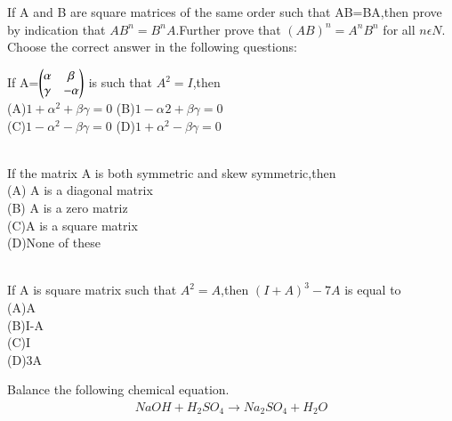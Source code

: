   \item If A and B are square matrices of the same order such that AB=BA,then prove by indication that $AB^{n}=B^{n}A$.Further prove that $(AB)^{n}=A^{n}B^{n}$ for all $n \epsilon N$.\\
  Choose the correct answer in the following questions:\\
  \item If A=$\begin{pmatrix}\alpha &\beta\\ \gamma &-\alpha\end{pmatrix}$ is such that $A^{2}=I$,then\\
  (A)$1+\alpha^{2}+\beta\gamma=0$ (B)$1-\alpha^{}2+\beta\gamma=0$\\
  (C)$1-\alpha^{2}-\beta\gamma=0$ (D)$1+\alpha^{2}-\beta\gamma=0$\\
\\
\solution

  \item If the matrix A is both symmetric and skew symmetric,then\\
  (A) A is a diagonal matrix \\
  (B) A is a zero matriz\\
  (C)A is a square matrix \\
  (D)None of these\\
  \\
\solution



  \item If A is square matrix such that $A^{2}=A$,then $(I+A)^{3}-7A$ is equal to\\
  (A)A \\(B)I-A\\ (C)I\\ (D)3A
\\
\solution

\item Balance the following chemical equation.
\begin{align}
  \label{matrix/50/eq1}
NaOH + H_2SO_4 \xrightarrow{} Na_2SO_4  +  H_2O
\end{align}
\\
\solution


